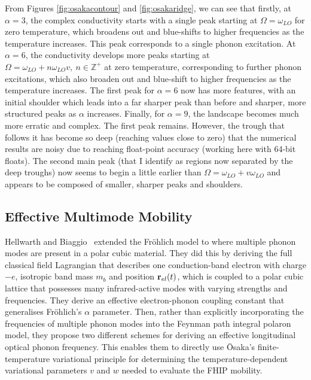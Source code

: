 From Figures \ref{fig:osakacontour} and \ref{fig:osakaridge}, we can see that firstly, at $\alpha = 3$, the complex conductivity starts with a single peak starting at $\Omega = \omega_{LO}$ for zero temperature, which broadens out and blue-shifts to higher frequencies as the temperature increases. This peak corresponds to a single phonon excitation. At $\alpha = 6$, the conductivity develops more peaks starting at $\Omega = \omega_{LO} + n \omega_{LO} v,\ n \in \mathbb{Z}^+$ at zero temperature, corresponding to further phonon excitations, which also broaden out and blue-shift to higher frequencies as the temperature increases. The first peak for $\alpha = 6$ now has more features, with an initial shoulder which leads into a far sharper peak than before and sharper, more structured peaks as $\alpha$ increases. Finally, for $\alpha = 9$, the landscape becomes much more erratic and complex. The first peak remains. However, the trough that follows it has become so deep (reaching values close to zero) that the numerical results are noisy due to reaching float-point accuracy (working here with 64-bit floats). The second main peak (that I identify as regions now separated by the deep troughs) now seems to begin a little earlier than $\Omega = \omega_{LO} + v \omega_{LO}$ and appears to be composed of smaller, sharper peaks and shoulders. 

\subsection{Effective Multimode Mobility}
\label{subsec:2-3-3}

Hellwarth and Biaggio~\cite{hellwarth_mobility_1999} extended the Fr\"ohlich model to where multiple phonon modes are present in a polar cubic material. They did this by deriving the full classical field Lagrangian that describes one conduction-band electron with charge $-e$, isotropic band mass $m_b$ and position $\vb{r}_{el}(t)$, which is coupled to a polar cubic lattice that possesses many infrared-active modes with varying strengths and frequencies. They derive an effective electron-phonon coupling constant that generalises Fr\"ohlich's $\alpha$ parameter. Then, rather than explicitly incorporating the frequencies of multiple phonon modes into the Feynman path integral polaron model, they propose two different schemes for deriving an effective longitudinal optical phonon frequency. This enables them to directly use \=Osaka's finite-temperature variational principle for determining the temperature-dependent variational parameters $v$ and $w$ needed to evaluate the FHIP mobility. 

